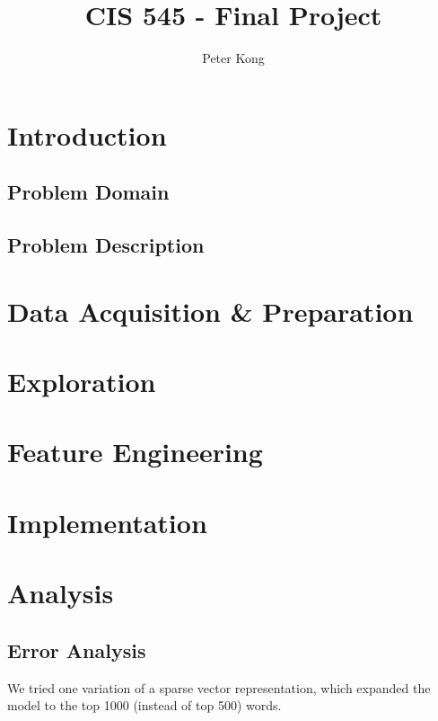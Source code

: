 \documentclass[12pt]{article}
\title{CIS 545 - Final Project}
\author{Peter Kong}
\begin{document}
\maketitle



\hrulefill

\section{Introduction}
\subsection{Problem Domain}
\subsection{Problem Description}

\section{Data Acquisition \& Preparation}

\section{Exploration}

\section{Feature Engineering}

\section{Implementation}

\section{Analysis}
\subsection{Error Analysis}

We tried one variation of a sparse vector representation, which expanded the model to the top 1000 (instead of top 500) words.


\end{document}
